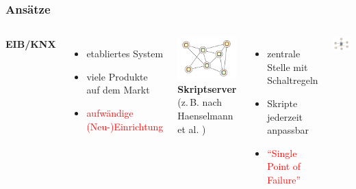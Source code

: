 \documentclass{beamer}
\newcommand{\customitemsep}{7pt}
\begin{document}
\begin{frame}
	\frametitle{Ansätze}
    \begin{columns}[c]
        \column[c]{10cm}
            \textbf{EIB/KNX} \cite{knx-prod}
            \begin{itemize} \setlength{\itemsep}{\customitemsep}
                \item etabliertes System
                \item viele Produkte auf dem Markt
                    \vspace*{0.5cm}
                \item \textcolor{red}{aufwändige (Neu-)Einrichtung}
            \end{itemize}
            \includegraphics[width=.9\linewidth]{img/decentralize-network.pdf}
            \pause
        \column{10cm}
            \textbf{Skriptserver} \\
            {\fontsize{15pt}{18pt} \selectfont (z.\,B. nach Haenselmann et al. \cite{haenselmann2007skriptbasierte})}
            \begin{itemize} \setlength{\itemsep}{\customitemsep}
                \item zentrale Stelle mit Schaltregeln
                \item Skripte jederzeit anpassbar
                    \vspace*{0.5cm}
                \item \textcolor{red}{\enquote{Single Point of Failure}}
            \end{itemize}
            \includegraphics[width=.9\linewidth]{img/centralize-network.pdf}

\end{columns}
\end{frame}
\end{document}
